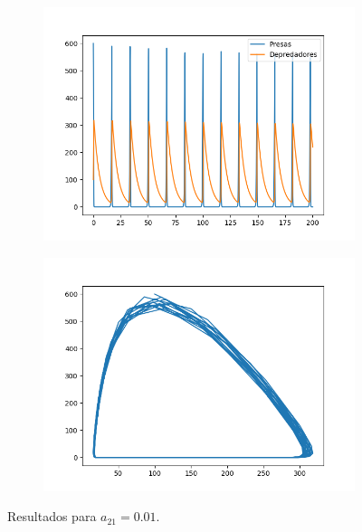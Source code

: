 \documentclass[11pt,a4paper]{article}
\begin{document}
\begin{figure}[H]
\centering
\begin{subfigure}{.5\textwidth}
	\centering
	\includegraphics[scale=0.45]{img/a21}
\end{subfigure}%
\begin{subfigure}{.5\textwidth}
	\centering
	\includegraphics[scale=0.45]{img/circulo-a21}
\end{subfigure}
\caption{Resultados para $a_{21} = 0.01$.}
\label{fig:a21}
\end{figure}
\end{document}
